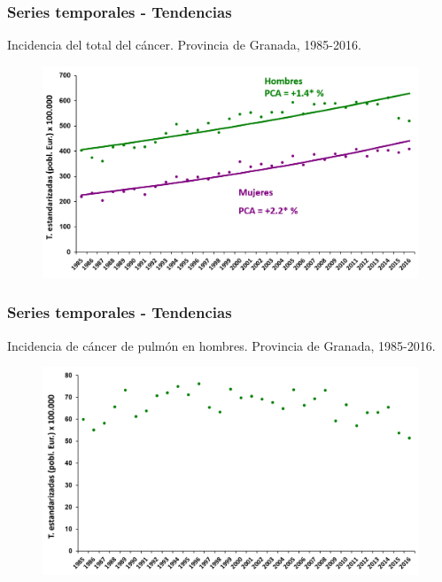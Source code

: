 \documentclass{beamer}
\begin{document}

\begin{frame}\frametitle{Series temporales - Tendencias}
	\centering
	Incidencia del total del cáncer. Provincia de Granada, 1985-2016.
	\begin{figure}
		\centering
		\includegraphics[width=\textwidth]{images/tendencias1.png}
	\end{figure}
\end{frame}


\begin{frame}\frametitle{Series temporales - Tendencias}
	\centering
	Incidencia de cáncer de pulmón en hombres. Provincia de Granada, 1985-2016.
	\begin{figure}
		\centering
		\includegraphics[width=\textwidth]{images/tendencias_pulmon0.png}
	\end{figure}
\end{frame}

\end{document}
